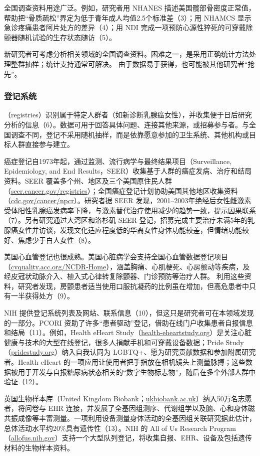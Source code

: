 全国调查资料用途广泛。例如，研究者用 NHANES 描述美国髋部骨密度正常值，帮助把“骨质疏松”界定为低于青年成人均值2.5个标准差（3）；用 NHAMCS 显示急诊疼痛患者阿片处方的差异（4）；用 NDI 完成一项预防心源性猝死的可穿戴除颤器随机试验的生存状态随访（5）。

新研究者可考虑分析相关领域的全国调查资料。困难之一，是采用正确统计方法处理整群抽样；统计支持通常可解决。
由于数据易于获得，也可能被其他研究者“抢先”。

\subsubsection{登记系统}
（registries）识别属于特定人群者（如新诊断乳腺癌女性），并收集便于日后研究分析的信息（6）。数据可用于回答具体问题、连接其他来源，或招募参与者。与全国调查不同，登记不采用随机抽样，而是依靠愿意参加的卫生系统、其他机构或目标人群直接参与建立。

癌症登记自1973年起，通过监测、流行病学与最终结果项目（Surveillance, Epidemiology, and End Results，SEER）收集基于人群的癌症发病、治疗和结局资料。SEER 覆盖多个州、地区及三个美国原住民人群（\url{seer.cancer.gov/registries}）；全国癌症登记计划协助美国其他地区收集资料（\url{cdc.gov/cancer/npcr}）。研究者据 SEER 发现，2001--2003年绝经后女性雌激素受体阳性乳腺癌发病率下降，与激素替代治疗使用减少的趋势一致，提示因果联系（7）。另有研究通过大湾区和洛杉矶 SEER 登记，招募完成主要治疗未满5年的乳腺癌女性并访谈，发现文化适应程度低的华裔女性身体功能较差，但情绪功能较好、焦虑少于白人女性（8）。

美国心血管登记也很成熟。美国心脏病学会支持全国心血管数据登记项目（\url{cvquality.acc.org/NCDR-Home}），涵盖胸痛、心肌梗死、心房颤动等疾病，及经皮冠状动脉介入、植入式心律转复除颤器、门诊预防等治疗人群。
利用这些资料，研究者发现，房颤患者适当使用口服抗凝药的比例虽在增加，但高危患者中只有一半获得处方（9）。

NIH 提供登记系统列表及网站、联系信息（10），但这只是研究者可在本领域发现的一部分。PCORI 资助了许多“患者驱动”登记，借助在线门户收集患者自报信息和结局（11）。例如，Health eHeart Study（\url{health-eheartstudy.org}）是关注心脏健康与技术的大型在线登记，很多人捐献手机和可穿戴设备数据；Pride Study（\url{pridestudy.org}）纳入自我认同为 LGBTQ+、愿为研究贡献数据和参加附属研究者。Health eHeart 的一项应用让使用者把手指放在相机镜头上测量脉搏；这些数据被用于开发与自报糖尿病状态相关的“数字生物标志物”，随后在多个外部人群中验证（12）。

英国生物样本库（United Kingdom Biobank；\url{ukbiobank.ac.uk}）纳入50万名志愿者，将问卷与 EHR 连接，并发展了全基因组测序、代谢组学以及脑、心和身体磁共振成像等丰富测量。一项利用设备测量身体活动的全基因组关联研究据此估计，总体活动水平约20\%具有遗传性（13）。NIH 的 All of Us Research Program（\url{allofus.nih.gov}）支持一个大型队列登记，将收集自报、EHR、设备及包括遗传材料的生物样本资料。

